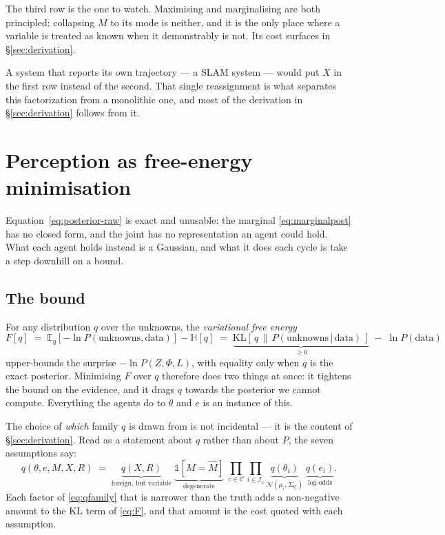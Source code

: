 \documentclass[11pt,a4paper]{report}
\newcommand{\given}{\,|\,}
\theoremstyle{definition}   %
\begin{document}
\noindent
The third row is the one to watch. Maximising and marginalising are both principled; collapsing
$M$ to its mode is neither, and it is the only place where a variable is treated as known when it
demonstrably is not. Its cost surfaces in \S\ref{sec:derivation}.

A system that reports its own trajectory --- a SLAM system --- would put $X$ in the first row
instead of the second. That single reassignment is what separates this factorization from a
monolithic one, and most of the derivation in \S\ref{sec:derivation} follows from it.

\section{Perception as free-energy minimisation}
\label{sec:fe}

Equation~\eqref{eq:posterior-raw} is exact and unusable: the marginal
\eqref{eq:marginalpost} has no closed form, and the joint has no representation an agent could
hold. What each agent holds instead is a Gaussian, and what it does each cycle is take a step
downhill on a bound.

\subsection{The bound}

For any distribution $q$ over the unknowns, the \emph{variational free energy}
\begin{equation}
F[q]\;=\;\mathbb{E}_{q}\!\left[-\ln P(\text{unknowns},\text{data})\right]-\mathbb{H}[q]
\;=\;\underbrace{\mathrm{KL}\!\left[\,q\,\|\,P(\text{unknowns}\given\text{data})\,\right]}_{\ge 0}
\;-\;\ln P(\text{data})
\label{eq:F}
\end{equation}
upper-bounds the surprise $-\ln P(Z,\Phi,L)$, with equality only when $q$ is the exact posterior.
Minimising $F$ over $q$ therefore does two things at once: it tightens the bound on the evidence,
and it drags $q$ towards the posterior we cannot compute. Everything the agents do to $\theta$ and
$e$ is an instance of this.

The choice of \emph{which} family $q$ is drawn from is not incidental --- it is the content of
\S\ref{sec:derivation}. Read as a statement about $q$ rather than about $P$, the seven assumptions
say:
\begin{equation}
q\!\left(\theta,e,M,X,R\right)\;=\;
\underbrace{q(X,R)}_{\text{foreign, but variable}}\;
\underbrace{\mathbb{1}\!\left[M=\hat M\right]}_{\text{degenerate}}\;
\prod_{c\in\mathcal{C}}\prod_{i\in\mathcal{I}_c}
\underbrace{q(\theta_i)}_{\mathcal{N}(\mu_i,\Sigma_{\theta_i})}\;
\underbrace{q(e_i)}_{\text{log-odds}} .
\label{eq:qfamily}
\end{equation}
Each factor of \eqref{eq:qfamily} that is narrower than the truth adds a non-negative amount to the
KL term of \eqref{eq:F}, and that amount is the cost quoted with each assumption.
\end{document}
